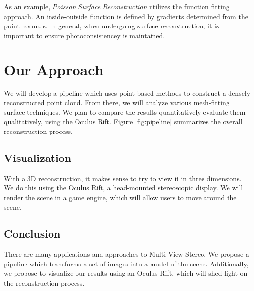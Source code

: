 \documentclass[10pt,twocolumn,letterpaper]{article}
\begin{document}
As an example, \textit{Poisson Surface Reconstruction} utilizes the function fitting approach.  An inside-outside function is defined by gradients determined from the point normals.\cite{poisson}  In general, when undergoing surface reconstruction, it is important to ensure photoconsistencey is maintained. 


\section{Our Approach}

We will develop a pipeline which uses point-based methods to construct a densely reconstructed point cloud. From there, we will analyze various mesh-fitting surface techniques.  We plan to compare the results quantitatively evaluate them qualitatively, using the Oculus Rift. Figure \ref{fig:pipeline} summarizes the overall reconstruction process.

\subsection{Visualization}
With a 3D reconstruction, it makes sense to try to view it in three dimensions. We do this using the Oculus Rift, a head-mounted stereoscopic display. We will render the scene in a game engine, which will allow users to move around the scene.\cite{unity}

\subsection{Conclusion}
There are many applications and approaches to Multi-View Stereo. We propose a pipeline which transforms a set of images into a model of the scene.  Additionally, we propose to visualize our results using an Oculus Rift, which will shed light on the reconstruction process.

{\small
  
  
}
\end{document}
